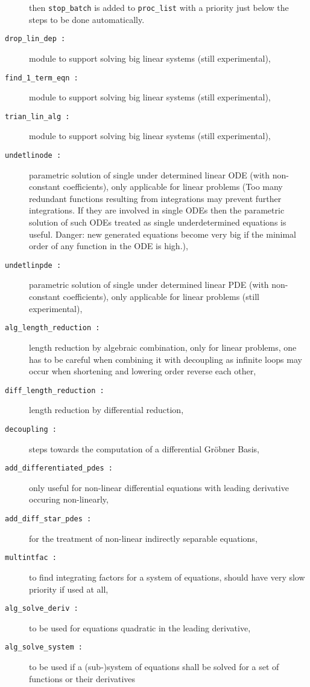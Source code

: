 \documentclass[12pt]{article}
\begin{document}
\begin{description}
then {\tt stop\_batch} is added to {\tt proc\_list} with a priority
just below the steps to be done automatically.
\item[{\tt drop\_lin\_dep :}] module to support
solving big linear systems (still experimental),
\item[{\tt find\_1\_term\_eqn :}] module to support
solving big linear systems (still experimental),
\item[{\tt trian\_lin\_alg :}] module to support
solving big linear systems (still experimental),
\item[{\tt undetlinode :}]  parametric solution of single under determined
linear ODE (with non-constant coefficients), only applicable for
linear problems (Too many redundant functions resulting from
integrations may prevent further integrations. If they are involved in
single ODEs then the parametric solution of such ODEs treated as
single underdetermined equations is useful. Danger: new generated
equations become very big if the minimal order of any function in the ODE is high.),
\item[{\tt undetlinpde :}]  parametric solution of single under determined
linear PDE (with non-constant coefficients), only applicable for
linear problems (still experimental),
\item[{\tt alg\_length\_reduction :}] length reduction by algebraic
combination, only for linear problems, one has to be careful when
combining it with decoupling as infinite loops may occur when
shortening and lowering order reverse each other,
\item[{\tt diff\_length\_reduction :}] length reduction by differential
reduction,
\item[{\tt decoupling :}] steps towards the computation of a
differential Gr\"{o}bner Basis,
\item[{\tt add\_differentiated\_pdes :}] only useful for non-linear
differential equations with leading derivative occuring non-linearly,
\item[{\tt add\_diff\_star\_pdes :}] for the treatment of non-linear
indirectly separable equations,
\item[{\tt multintfac :}] to find integrating factors for a system
of equations, should have very slow priority if used at all,
\item[{\tt alg\_solve\_deriv :}] to be used for equations quadratic in
the leading derivative,
\item[{\tt alg\_solve\_system :}] to be used if a (sub-)system of
equations shall be solved for a set of functions or their derivatives

\end{description}
\end{document}
